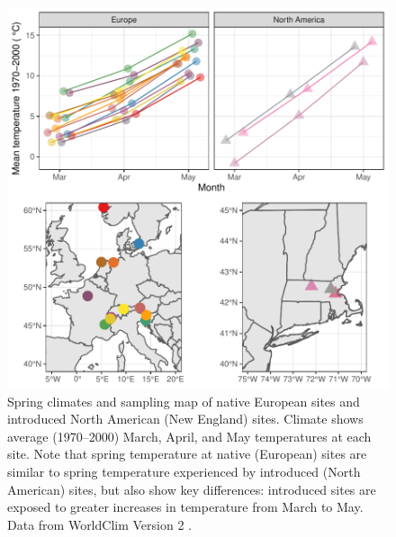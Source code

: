 \documentclass[11pt]{article}\usepackage[]{graphicx}\usepackage[]{color}
\begin{document}
	
	\begin{figure} 
		\centering
		\includegraphics[width=1 \textwidth,trim=0cm 0cm 0cm 0cm, angle=0, scale=.9, origin=c,clip=false]{sampling_sites}
		\caption{Spring climates and sampling map of native European sites and introduced North American (New England) sites. Climate shows average (1970--2000) March, April, and May temperatures at each site. Note that spring temperature at native (European) sites are similar to spring temperature experienced by introduced (North American) sites, but also show key differences: introduced sites are exposed to greater increases in temperature from March to May. Data from WorldClim Version 2 \parencite{Fick2017}. } %
		\label{fig:sites}
	\end{figure}
\end{document}
